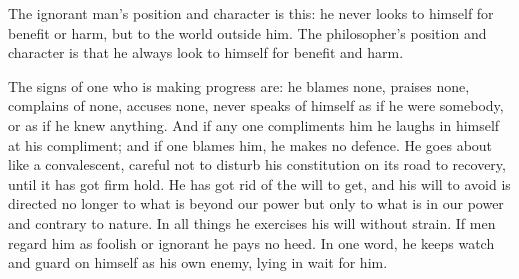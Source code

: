 The ignorant  man's position and character  is this: he never  looks to himself
for benefit or  harm, but to the world outside  him. The philosopher's position
and character is that he always look to himself for benefit and harm.

The signs  of one  who is making  progress are: he  blames none,  praises none,
complains  of  none, accuses  none,  never  speaks of  himself  as  if he  were
somebody, or as if  he knew anything. And if any one  compliments him he laughs
in himself at  his compliment; and if  one blames him, he makes  no defence. He
goes about like a convalescent, careful  not to disturb his constitution on its
road to  recovery, until it has  got firm hold. He  has got rid of  the will to
get, and his  will to avoid is directed  no longer to what is  beyond our power
but only  to what  is in our  power and  contrary to nature.  In all  things he
exercises his will without strain. If men  regard him as foolish or ignorant he
pays no  heed. In  one word, he  keeps watch  and guard on  himself as  his own
enemy, lying in wait for him.
